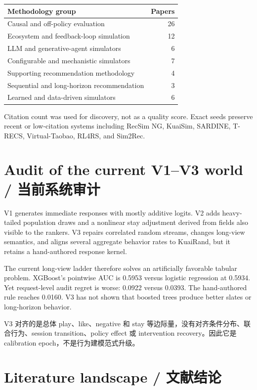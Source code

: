 \documentclass[10.5pt,a4paper]{article}
\begin{document}
\begin{center}
\begin{tabular}{lr}
\toprule
Methodology group & Papers \\
\midrule
Causal and off-policy evaluation & 26 \\
Ecosystem and feedback-loop simulation & 12 \\
LLM and generative-agent simulators & 6 \\
Configurable and mechanistic simulators & 7 \\
Supporting recommendation methodology & 4 \\
Sequential and long-horizon recommendation & 3 \\
Learned and data-driven simulators & 6 \\
\bottomrule
\end{tabular}
\end{center}

Citation count was used for discovery, not as a quality score. Exact seeds preserve recent or low-citation systems including RecSim NG, KuaiSim, SARDINE, T-RECS, Virtual-Taobao, RL4RS, and Sim2Rec.

\section{Audit of the current V1--V3 world / 当前系统审计}

V1 generates immediate responses with mostly additive logits. V2 adds heavy-tailed population draws and a nonlinear stay adjustment derived from fields also visible to the rankers. V3 repairs correlated random streams, changes long-view semantics, and aligns several aggregate behavior rates to KuaiRand, but it retains a hand-authored response kernel.

The current long-view ladder therefore solves an artificially favorable tabular problem. XGBoost's pointwise AUC is 0.5953 versus logistic regression at 0.5934. Yet request-level audit regret is worse: 0.0922 versus 0.0393. The hand-authored rule reaches 0.0160. V3 has not shown that boosted trees produce better slates or long-horizon behavior.

V3 对齐的是总体 play、like、negative 和 stay 等边际量，没有对齐条件分布、联合行为、session transition、policy effect 或 intervention recovery。因此它是 calibration epoch，不是行为建模范式升级。

\section{Literature landscape / 文献结论}
\end{document}
